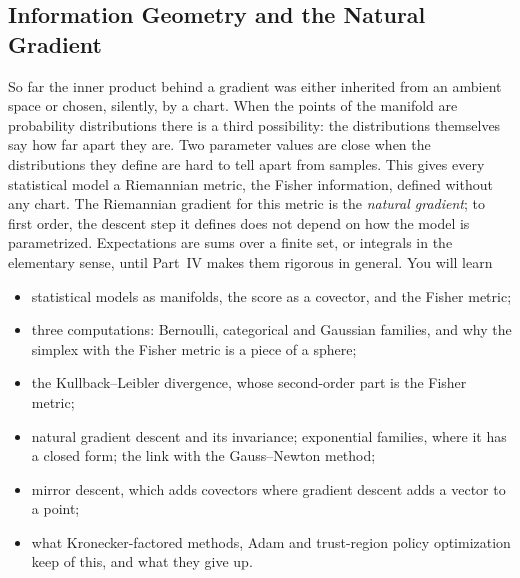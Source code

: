 \begin{notechapter}
\chapter{Information Geometry and the Natural Gradient}
\label{ch:natural-gradient}

\begin{chapterintro}
So far the inner product behind a gradient was either inherited from an
ambient space or chosen, silently, by a chart. When the points of the
manifold are probability distributions there is a third possibility: the
distributions themselves say how far apart they are. Two parameter values
are close when the distributions they define are hard to tell apart from
samples. This gives every statistical model a Riemannian metric, the
Fisher information, defined without any chart. The Riemannian gradient
for this metric is the \emph{natural gradient}; to first order, the
descent step it defines does not depend on how the model is
parametrized. Expectations are sums over a finite set, or integrals in
the elementary sense, until Part~IV makes them rigorous in general. You
will learn
\begin{itemize}[nosep]
  \item statistical models as manifolds, the score as a covector, and
        the Fisher metric;
  \item three computations: Bernoulli, categorical and Gaussian families,
        and why the simplex with the Fisher metric is a piece of a
        sphere;
  \item the Kullback--Leibler divergence, whose second-order part is the
        Fisher metric;
  \item natural gradient descent and its invariance; exponential
        families, where it has a closed form; the link with the
        Gauss--Newton method;
  \item mirror descent, which adds covectors where gradient descent adds
        a vector to a point;
  \item what Kronecker-factored methods, Adam and trust-region policy
        optimization keep of this, and what they give up.
\end{itemize}
\end{chapterintro}


\end{notechapter}
